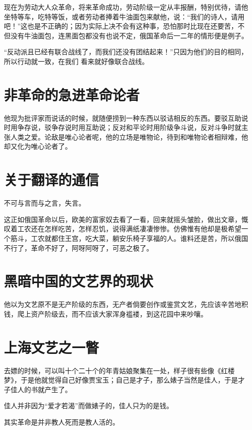 \documentclass[a4paper]{ctexart}
\begin{document}
\begin{sloppy}
        现在为劳动大人众革命，将来革命成功，劳动阶级一定从丰报酬，特别优待，请他坐特等车，吃特等饭，或者劳动者捧着牛油面包来献他，说：“我们的诗人，请用吧！”这也是不正确的；因为实际上决不会有这种事，恐怕那时比现在还要苦，不但没有牛油面包，连黑面包都没有也说不定，俄国革命后一二年的情形便是例子。

        “反动派且已经有联合战线了，而我们还没有团结起来！”只因为他们的目的相同，所以行动就一致，在我们 看来就好像联合战线。

        \section{
            非革命的急进革命论者
        }
        他现为批评家而说话的时候，就随便捞到一种东西以驳诘相反的东西。要驳互助说时用争存说，驳争存说时用互助说；反对和平论时用阶级争斗说，反对斗争时就主张人类之爱。论敌是唯心论者呢，他的立场是唯物论，待到和唯物论者相辩难，他却又化为唯心论者了。

        \section{
            关于翻译的通信
        }
        不可与言而与之言，失言。

        这正如俄国革命以后，欧美的富家奴去看了一看，回来就摇头皱脸，做出文章，慨叹着工农还在怎样吃苦，怎样忍饥，说得满纸凄凄惨惨。仿佛惟有他却是极希望一个筋斗，工农就都住王宫，吃大菜，躺安乐椅子享福的人。谁料还是苦，所以俄国不行了，革命不好了，阿呀阿呀了，可恶之极了。

        \section{
            黑暗中国的文艺界的现状
        }
        他以为文艺原不是无产阶级的东西，无产者倘要创作或鉴赏文艺，先应该辛苦地积钱，爬上资产阶级去，而不应该大家浑身褴褛，到这花园中来吵嚷。

        \section{
            上海文艺之一瞥
        }
        去嫖的时候，可以叫十个二十个的年青姑娘聚集在一处，样子很有些像《红楼梦》，于是他就觉得自己好像贾宝玉；自己是才子，那么婊子当然是佳人，于是才子佳人的书就产生了。

        佳人并非因为“爱才若渴”而做婊子的，佳人只为的是钱。

        其实革命是并非教人死而是教人活的。


\end{sloppy}
\end{document}
